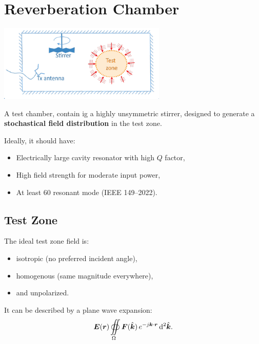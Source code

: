 \section{Reverberation Chamber}
\includegraphics[width=8cm]{content/at_meas/pictures/reverberation_chamber}

A test chamber, contain ig a highly unsymmetric stirrer, designed to generate a \textbf{stochastical field distribution} in the test zone.

Ideally, it should have:
\begin{itemize}
  \item Electrically large cavity resonator with high $Q$ factor,
  \item High field strength for moderate input power,
  \item At least 60 resonant mode (IEEE 149--2022).
\end{itemize}

\subsection{Test Zone}
The ideal test zone field is:
\begin{itemize}
  \item isotropic (no preferred incident angle),
  \item homogenous (same magnitude everywhere),
  \item and unpolarized.
\end{itemize}

It can be described by a plane wave expansion:
\begin{equation}
  \boldsymbol{E}(\boldsymbol{r}) \oiint\limits_{\Omega} \boldsymbol{F}(\hat{\boldsymbol{k}}) \, e^{-j\boldsymbol{k}\cdot\boldsymbol{r}}\, \mathrm{d}^{2}\hat{\boldsymbol{k}}.
\end{equation}

